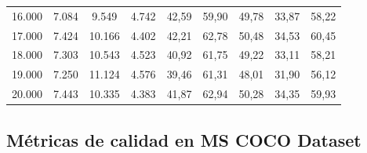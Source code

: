 \begin{table}[ht!]
\begin{tabular}{lcccccccc}
16.000              & 7.084          & 9.549          & 4.742          & 42,59                                                             & 59,90                                                          & 49,78                                                           & 33,87                                                               & 58,22                                                             \\
17.000              & 7.424          & 10.166         & 4.402          & 42,21                                                             & 62,78                                                          & 50,48                                                           & 34,53                                                               & 60,45                                                             \\
18.000              & 7.303          & 10.543         & 4.523          & 40,92                                                             & 61,75                                                          & 49,22                                                           & 33,11                                                               & 58,21                                                             \\
19.000              & 7.250          & 11.124         & 4.576          & 39,46                                                             & 61,31                                                          & 48,01                                                           & 31,90                                                               & 56,12                                                             \\
20.000              & 7.443          & 10.335         & 4.383          & 41,87                                                             & 62,94                                                          & 50,28                                                           & 34,35                                                               & 59,93                                                             \\ \hline
\end{tabular}
\end{table}

\newpage

\subsection{Métricas de calidad en MS COCO Dataset}
\label{subsec:metricas-calidad-coco}


